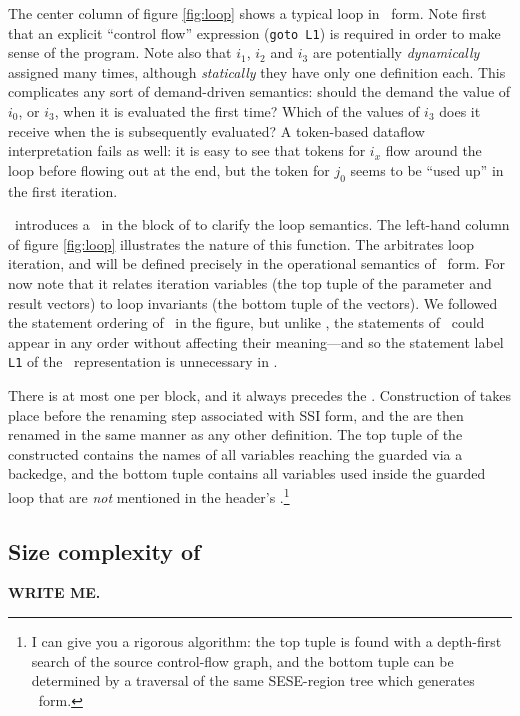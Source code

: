 \documentclass[12pt,notitlepage,twoside]{article}
\begin{document}
The center column of figure \ref{fig:loop} shows a typical loop in
\ssizero\ form.  Note first that an explicit ``control flow''
expression (\texttt{goto L1}) is required in order to make sense of
the program.  Note also that $i_1$, $i_2$ and $i_3$ are potentially
\emph{dynamically} assigned many times, although \emph{statically}
they have only one definition each.  This complicates any sort of
demand-driven semantics: should the \phifunction{} demand the value of
$i_0$, or $i_3$, when it is evaluated the first time?  Which of the
values of $i_3$ does it receive when the \phifunction{} is
subsequently evaluated?  A token-based dataflow interpretation fails
as well: it is easy to see that tokens for $i_x$ flow around the loop
before flowing out at the end, but the token for $j_0$ seems to be
``used up'' in the first iteration.

\ssiplus\ introduces a \xifunction\ in the block of  to
clarify the loop semantics. The left-hand column of figure
\ref{fig:loop} illustrates the nature of this function.  The
\xifunction{} arbitrates loop iteration, and will be defined precisely
in the operational semantics of \ssiplus\ form.  For now note that it
relates iteration variables (the top tuple of the parameter and result
vectors) to loop invariants (the bottom tuple of the vectors).  We
followed the statement ordering of \ssizero\ in the figure, but unlike
\ssizero, the statements of \ssiplus\ could appear in any order
without affecting their meaning---and so the statement label
\texttt{L1} of the \ssizero\ representation is unnecessary in \ssiplus.

There is at most one \xifunction{} per \phifunction{} block, and it
always precedes the .  Construction of 
takes place before the renaming step associated with SSI form, and the
 are then renamed in the same manner as any other
definition.  The top tuple of the constructed \xifunction{} contains
the names of all variables reaching the guarded \phifunction{} via a
backedge, and the bottom tuple contains all variables used inside the
guarded loop that are {\em not} mentioned in the header's
\phifunction{}.\footnote{I can give you a rigorous algorithm: the top
tuple is found with a depth-first search of the source
control-flow graph, and the bottom tuple can be determined by a
traversal of the same SESE-region tree which generates \ssizero\
form.}

\subsection{Size complexity of \ssiplus}
\textbf{WRITE ME.}
\end{document}
